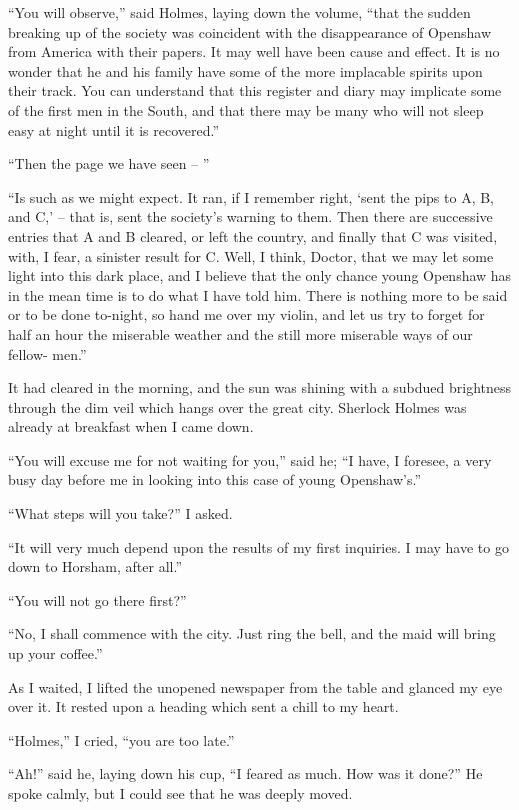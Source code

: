 “You will observe,” said Holmes, laying down the volume,
“that the sudden breaking up of the society was coincident
with the disappearance of Openshaw from America with their
papers. It may well have been cause and effect. It is no
wonder that he and his family have some of the more implacable
spirits upon their track. You can understand that this
register and diary may implicate some of the first men in the
South, and that there may be many who will not sleep easy at
night until it is recovered.”

“Then the page we have seen -- ”

“Is such as we might expect. It ran, if I remember right,
‘sent the pips to A, B, and C,’ -- that is, sent the society’s
warning to them. Then there are successive entries that A
and B cleared, or left the country, and finally that C was visited,
with, I fear, a sinister result for C. Well, I think, Doctor,
that we may let some light into this dark place, and I
believe that the only chance young Openshaw has in the
mean time is to do what I have told him. There is nothing
more to be said or to be done to-night, so hand me over my
violin, and let us try to forget for half an hour the miserable
weather and the still more miserable ways of our fellow-%
men.”

\strut

It had cleared in the morning, and the sun was shining
with a subdued brightness through the dim veil which hangs
over the great city. Sherlock Holmes was already at breakfast
when I came down.

“You will excuse me for not waiting for you,” said he; “I
have, I foresee, a very busy day before me in looking into this
case of young Openshaw’s.”

“What steps will you take?” I asked.

“It will very much depend upon the results of my first inquiries.
I may have to go down to Horsham, after all.”

“You will not go there first?”

“No, I shall commence with the city. Just ring the bell,
and the maid will bring up your coffee.”

As I waited, I lifted the unopened newspaper from the table
and glanced my eye over it. It rested upon a heading which
sent a chill to my heart.

“Holmes,” I cried, “you are too late.”

“Ah!” said he, laying down his cup, “I feared as much.
How was it done?” He spoke calmly, but I could see that
he was deeply moved.

